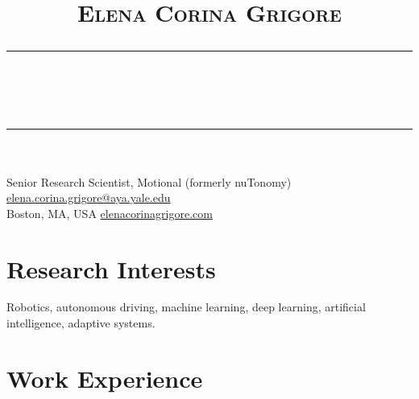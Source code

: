 \documentclass[10pt,letterpaper]{article}
\title{\vspace{-5em}
	\Huge{\textsc{Elena Corina Grigore}}
	\vspace{-0.5em}
	\\\noindent\rule{\linewidth}{0.5pt}
	\vspace{-2.5em}
	\\\noindent\rule{\linewidth}{0.5pt}
	\vspace{-3.2em}
}
\date{}
\begin{document}
\maketitle
\thispagestyle{fancy}



Senior Research Scientist, Motional (formerly nuTonomy) \hfill \href{mailto:elena.corina.grigore@aya.yale.edu}{elena.corina.grigore@aya.yale.edu}\\
Boston, MA, USA \hfill \href{http://elenacorinagrigore.com}{elenacorinagrigore.com}

\vspace{-0.5em}
\section{Research Interests}
\vspace{-0.5em}
Robotics, autonomous driving, machine learning, deep learning, artificial intelligence, adaptive systems.
	
\vspace{-1em}
\section{Work Experience}
\end{document}
